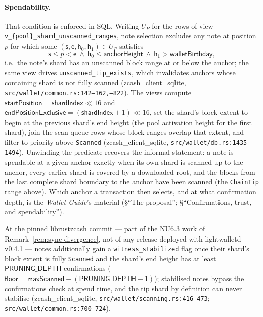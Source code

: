 \documentclass[11pt,a4paper]{article}
\theoremstyle{definition}
\begin{document}
\paragraph{Spendability.} That condition is enforced in SQL. Writing
$U_P$ for the rows of view
\texttt{v\_\{pool\}\_shard\_unscanned\_ranges}, note selection excludes
any note at position $p$ for which some
$(\mathsf{s}, \mathsf{e}, \mathsf{h}_0, \mathsf{h}_1) \in U_P$ satisfies
\[
\mathsf{s} \le p < \mathsf{e}
\ \wedge\
\mathsf{h}_0 \le \mathsf{anchorHeight}
\ \wedge\
\mathsf{h}_1 > \mathsf{walletBirthday},
\]
i.e.\ the note's shard has an unscanned block range at or below the
anchor; the same view drives \texttt{unscanned\_tip\_exists}, which
invalidates anchors whose containing shard is not fully scanned
(\textsf{zcash\_client\_sqlite},
\texttt{src/wallet/common.rs:142--162,\allowbreak 762--822}). The views compute
$\mathsf{startPosition} = \mathsf{shardIndex} \ll 16$ and
$\mathsf{endPositionExclusive} = (\mathsf{shardIndex} + 1) \ll 16$, set
the shard's block extent to begin at the previous shard's end height
(the pool activation height for the first shard), join the scan-queue
rows whose block ranges overlap that extent, and filter to priority
above \texttt{Scanned}
(\textsf{zcash\_client\_sqlite}, \texttt{src/wallet/db.rs:1435--1494}).
Unwinding the predicate recovers the informal statement: a note is
spendable at a given anchor exactly when its own shard is scanned up to
the anchor, every earlier shard is covered by a downloaded root, and the
blocks from the last complete shard boundary to the anchor have been
scanned (the \texttt{ChainTip} range above). Which anchor a transaction
then selects, and at what confirmation depth, is the \emph{Wallet
Guide}'s material (\S``The proposal''; \S``Confirmations, trust, and
spendability'').

At the pinned \textsf{librustzcash} commit --- part of the NU6.3 work of
Remark~\ref{rem:sync-divergence}, not of any release deployed with
\textsf{lightwalletd} v0.4.1 --- notes additionally gain a
\texttt{witness\_stabilized} flag once their shard's block extent is
fully \texttt{Scanned} and the shard's end height has at least
$\mathsf{PRUNING\_DEPTH}$ confirmations
($\mathsf{floor} = \mathsf{maxScanned} - (\mathsf{PRUNING\_DEPTH} - 1)$);
stabilised notes bypass the confirmations check at spend time, and the
tip shard by definition can never stabilise
(\textsf{zcash\_client\_sqlite},
\texttt{src/wallet/scanning.rs:416--473};
\texttt{src/wallet/common.rs:700--724}).
\end{document}
